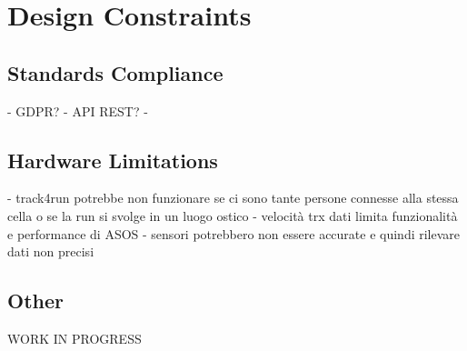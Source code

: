 \documentclass[../../rasd.tex]{subfiles}
\begin{document}
\section{Design Constraints}
			\subsection{Standards Compliance}
				- GDPR?
				- API REST?
				- 
			\subsection{Hardware Limitations}
				- track4run potrebbe non funzionare se ci sono tante persone connesse alla stessa cella o se la run si svolge in un luogo ostico
				- velocità trx dati limita funzionalità e performance di ASOS
				- sensori potrebbero non essere accurate e quindi rilevare dati non precisi
			\subsection{Other}
			WORK IN PROGRESS
\end{document}
